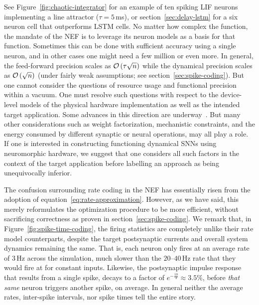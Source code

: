 See Figure~\ref{fig:chaotic-integrator} for an example of ten spiking LIF neurons implementing a line attractor ($\tau = 5$\,ms), or section~\ref{sec:delay-lstm} for a six neuron cell that outperforms LSTM cells.
No matter how complex the function, the mandate of the NEF is to leverage its neuron models as a basis for that function. 
Sometimes this can be done with sufficient accuracy using a single neuron, and in other cases one might need a few million or even more.
In general, the feed-forward precision scales as $\mathcal{O}\left({\tau \sqrt{n}}\right)$ while the dynamical precision scales as $\mathcal{O}\left({\sqrt{n}}\right)$ (under fairly weak assumptions; see section~\ref{sec:spike-coding}).
But one cannot consider the questions of resource usage and functional precision within a vacuum.
One must resolve such questions with respect to the device-level models of the physical hardware implementation as well as the intended target application.
Some advances in this direction are underway~\citep{schwemmer2015constructing, thalmeier2016learning}.
But many other considerations such as weight factorization, mechanistic constraints, and the energy consumed by different synaptic or neural operations, may all play a role.
If one is interested in constructing functioning dynamical SNNs using neuromorphic hardware, we suggest that one considers all such factors in the context of the target application before labelling an approach as being unequivocally inferior.

The confusion surrounding rate coding in the NEF has essentially risen from the adoption of equation~\ref{eq:rate-approximation}.
However, as we have said, this merely reformulates the optimization procedure to be more efficient, without sacrificing correctness as proven in section~\ref{sec:spike-coding}.
We remark that, in Figure~\ref{fig:spike-time-coding}, the firing statistics are completely unlike their rate model counterparts, despite the target postsynaptic currents and overall system dynamics remaining the same.
That is, each neuron only fires at an average rate of $3$\,Hz across the simulation, much slower than the $20$--$40$\,Hz rate that they would fire at for constant inputs.
Likewise, the postsynaptic impulse response that results from a single spike, decays to a factor of $e^{-\frac{10}{3}} \approx 3.5\%$, before \emph{that same} neuron triggers another spike, on average.
In general neither the average rates, inter-spike intervals, nor spike times tell the entire story.


